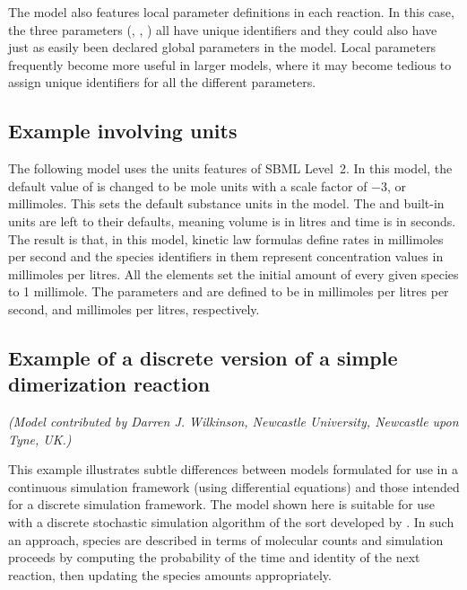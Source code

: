 The model also features local parameter definitions in each
reaction.  In this case, the three parameters (,
, ) all have unique identifiers and they could
also have just as easily been declared global parameters in the
model.  Local parameters frequently become more useful in larger
models, where it may become tedious to assign unique identifiers
for all the different parameters.


\subsection{Example involving units}
\label{apdx:units-eg}

The following model uses the units features of SBML Level~2. In
this model, the default value of  is changed to
be mole units with a scale factor of $-3$, or millimoles.  This
sets the default substance units in the model.  The 
and  built-in units are left to their defaults, meaning
volume is in litres and time is in seconds.  The result is that, in
this model, kinetic law formulas define rates in millimoles per
second and the species identifiers in them represent concentration
values in millimoles per litres.  All the  elements
set the initial amount of every given species to 1 millimole.  The
parameters  and  are defined to be in millimoles
per litres per second, and millimoles per litres, respectively.



\subsection{Example of a discrete version of a simple dimerization reaction}
\label{sec:discrete-eg}

\emph{(Model contributed by Darren J. Wilkinson, Newcastle
  University, Newcastle upon Tyne, UK.)}

This example illustrates subtle differences between models
formulated for use in a continuous simulation framework (\eg using
differential equations) and those intended for a discrete
simulation framework.  The model shown here is suitable for use
with a discrete stochastic simulation algorithm of the sort
developed by \cite{gillespie:1977}.  In such an approach, species
are described in terms of molecular counts and simulation
proceeds by computing the probability of the time and identity of
the next reaction, then updating the species amounts
appropriately.

